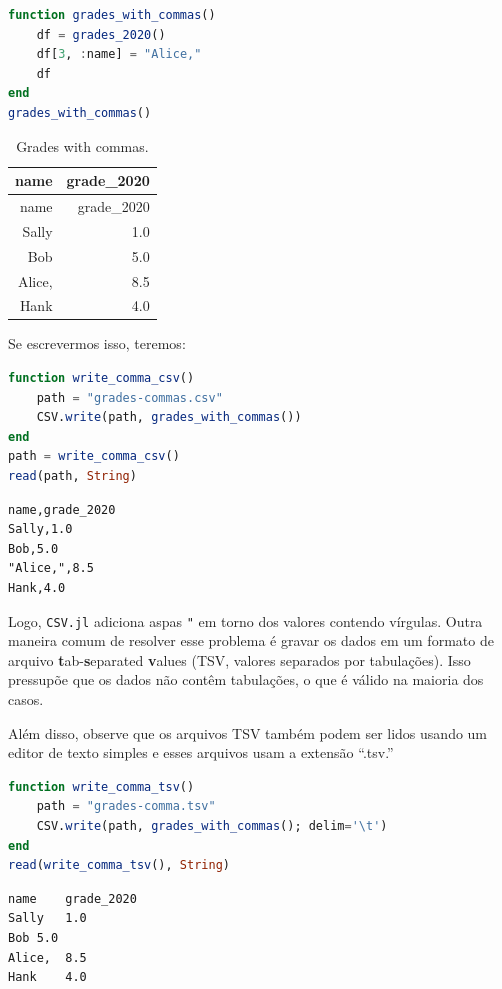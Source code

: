 \documentclass[
  notoc %
]{tufte-book}
\newcommand{\passthrough}[1]{#1}
\begin{document}
\begin{lstlisting}[language=Julia]
function grades_with_commas()
    df = grades_2020()
    df[3, :name] = "Alice,"
    df
end
grades_with_commas()
\end{lstlisting}

\hypertarget{tbl:grades_with_commas}{}
\begin{longtable}[]{@{}rr@{}}
\caption{\label{tbl:grades_with_commas}Grades with
commas.}\tabularnewline
\toprule
name & grade\_2020 \\
\midrule
\endfirsthead
\toprule
name & grade\_2020 \\
\midrule
\endhead
Sally & 1.0 \\
Bob & 5.0 \\
Alice, & 8.5 \\
Hank & 4.0 \\
\bottomrule
\end{longtable}

Se escrevermos isso, teremos:

\begin{lstlisting}[language=Julia]
function write_comma_csv()
    path = "grades-commas.csv"
    CSV.write(path, grades_with_commas())
end
path = write_comma_csv()
read(path, String)
\end{lstlisting}

\begin{lstlisting}[language=Output]
name,grade_2020
Sally,1.0
Bob,5.0
"Alice,",8.5
Hank,4.0

\end{lstlisting}

Logo, \passthrough{\lstinline!CSV.jl!} adiciona aspas
\passthrough{\lstinline!"!} em torno dos valores contendo vírgulas.
Outra maneira comum de resolver esse problema é gravar os dados em um
formato de arquivo \textbf{t}ab-\textbf{s}eparated \textbf{v}alues (TSV,
valores separados por tabulações). Isso pressupõe que os dados não
contêm tabulações, o que é válido na maioria dos casos.

Além disso, observe que os arquivos TSV também podem ser lidos usando um
editor de texto simples e esses arquivos usam a extensão ``.tsv.''

\begin{lstlisting}[language=Julia]
function write_comma_tsv()
    path = "grades-comma.tsv"
    CSV.write(path, grades_with_commas(); delim='\t')
end
read(write_comma_tsv(), String)
\end{lstlisting}

\begin{lstlisting}[language=Output]
name    grade_2020
Sally   1.0
Bob 5.0
Alice,  8.5
Hank    4.0

\end{lstlisting}
\end{document}
